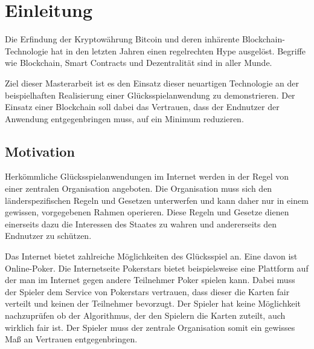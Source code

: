 
\chapter{Einleitung} %

\label{Chapter1} %


\newcommand{\keyword}[1]{\textbf{#1}}
\newcommand{\tabhead}[1]{\textbf{#1}}
\newcommand{\code}[1]{\texttt{#1}}
\newcommand{\file}[1]{\texttt{\bfseries#1}}
\newcommand{\option}[1]{\texttt{\itshape#1}}

Die Erfindung der Kryptowährung Bitcoin und deren inhärente Blockchain-Technologie hat in den letzten Jahren einen regelrechten Hype ausgelöst. Begriffe wie Blockchain, Smart Contracts und Dezentralität sind in aller Munde. 

Ziel dieser Masterarbeit ist es den Einsatz dieser neuartigen Technologie an der beispielhaften Realisierung einer Glücksspielanwendung zu demonstrieren. Der Einsatz einer Blockchain soll dabei das Vertrauen, dass der Endnutzer der Anwendung entgegenbringen muss, auf ein Minimum reduzieren.

\section{Motivation}


Herkömmliche Glücksspielanwendungen im Internet werden in der Regel von einer zentralen Organisation angeboten. Die Organisation muss sich den länderspezifischen Regeln und Gesetzen unterwerfen und kann daher nur in einem gewissen, vorgegebenen Rahmen operieren. Diese Regeln und Gesetze dienen einerseits dazu die Interessen des Staates zu wahren und andererseits den Endnutzer zu schützen. 

Das Internet bietet zahlreiche Möglichkeiten des Glücksspiel an. Eine davon ist Online-Poker. Die Internetseite Pokerstars \cite{pokerstars} bietet beispielsweise eine Plattform auf der man im Internet gegen andere Teilnehmer Poker spielen kann. Dabei muss der Spieler dem Service von Pokerstars vertrauen, dass dieser die Karten fair verteilt und keinen der Teilnehmer bevorzugt. Der Spieler hat keine Möglichkeit nachzuprüfen ob der Algorithmus, der den Spielern die Karten zuteilt, auch wirklich fair ist. Der Spieler muss der zentrale Organisation somit ein gewisses Maß an Vertrauen entgegenbringen. 


